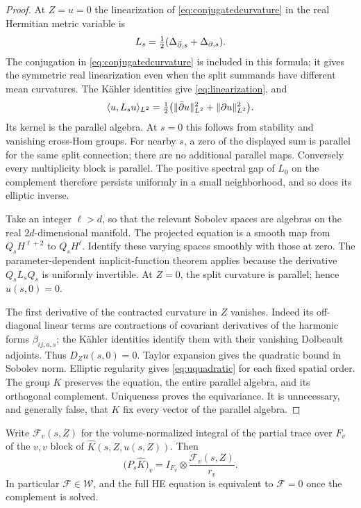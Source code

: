 \begin{proof}
At $Z=u=0$ the linearization of \eqref{eq:conjugatedcurvature} in
the real Hermitian metric variable is
\begin{equation}\label{eq:linearization}
L_s=\tfrac12(\Delta_{\bar\partial,s}+\Delta_{\partial,s}).
\end{equation}
The conjugation in \eqref{eq:conjugatedcurvature} is included in
this formula; it gives the symmetric real linearization even when
the split summands have different mean curvatures. The Kähler
identities give \eqref{eq:linearization}, and
\[
\langle u,L_su\rangle_{L^2}
=\tfrac12\bigl(\|\bar\partial u\|_{L^2}^2+\|\partial u\|_{L^2}^2\bigr).
\]
Its kernel is the parallel algebra. At $s=0$ this follows from
stability and vanishing cross-Hom groups. For nearby $s$, a zero
of the displayed sum is parallel for the same split connection;
there are no additional parallel maps. Conversely every
multiplicity block is parallel. The positive spectral gap of
$L_0$ on the complement therefore persists uniformly in a small
neighborhood, and so does its elliptic inverse.

Take an integer $\ell>d$, so that the relevant Sobolev spaces are
algebras on the real $2d$-dimensional manifold. The projected equation
is a smooth map from $Q_sH^{\ell+2}$ to $Q_sH^\ell$.
Identify these varying spaces smoothly with those at zero. The
parameter-dependent implicit-function theorem applies because the
derivative $Q_sL_sQ_s$ is uniformly invertible. At $Z=0$, the split
curvature is parallel; hence $u(s,0)=0$.

The first derivative of the contracted curvature in $Z$ vanishes.
Indeed its off-diagonal linear terms are contractions of covariant
derivatives of the harmonic forms $\beta_{ij,a,s}$; the Kähler
identities identify them with their vanishing Dolbeault adjoints.
Thus $D_Zu(s,0)=0$. Taylor expansion gives the quadratic bound in
Sobolev norm. Elliptic regularity gives \eqref{eq:uquadratic} for
each fixed spatial order. The group $K$ preserves the equation,
the entire parallel algebra, and its orthogonal complement.
Uniqueness proves the equivariance. It is unnecessary, and generally
false, that $K$ fix every vector of the parallel algebra.
\end{proof}

Write $\mathcal F_v(s,Z)$ for the volume-normalized integral of the
partial trace over $F_v$ of the $v,v$ block of
$\widehat K(s,Z,u(s,Z))$. Then
\begin{equation}\label{eq:reducedprojection}
\bigl(P_s\widehat K\bigr)_v
=I_{F_v}\otimes\frac{\mathcal F_v(s,Z)}{r_v}.
\end{equation}
In particular $\mathcal F\in\mathcal W$, and the full HE equation
is equivalent to $\mathcal F=0$ once the complement is solved.

